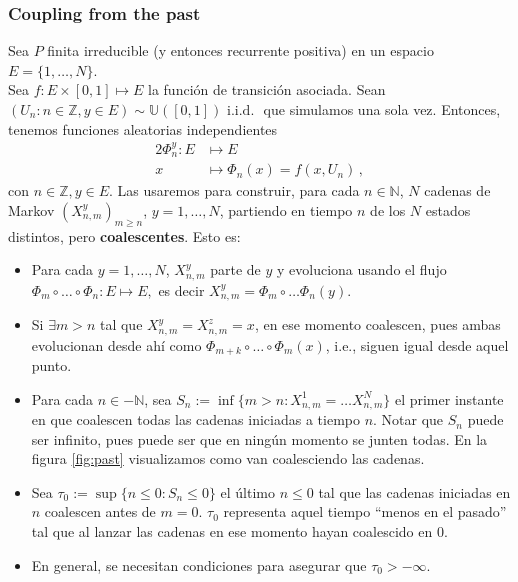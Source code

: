 \documentclass[letterpaper,11pt]{article} %
\theoremstyle{defbreak}
\theoremstyle{propbreak}
\theoremstyle{remark}
\theoremstyle{break}
\def\N{\mathbb{N}}
\def\unif{\mathbb{U}([0,1])}
\def\iid{\mbox{ i.i.d. }}
\begin{document}
\subsubsection{Coupling from the past}
Sea $P$ finita irreducible (y entonces recurrente positiva) en un espacio $E=\{1,\dots,N\}$. \\ Sea $f:E\times[0,1]\mapsto E$ la función de transición asociada. Sean $(U_n:n\in\mathbb{Z},y\in E)\sim\unif\iid$ que simulamos una sola vez.
Entonces, tenemos funciones aleatorias independientes
\begin{alignat*}{2}
\Phi_n^y:E & \longmapsto E \\
x & \longmapsto \Phi_n(x) = f(x,U_n)\, ,
\end{alignat*}
con $n\in\mathbb{Z}, y\in E$. Las usaremos para construir, para cada $n\in\N$, $N$ cadenas de Markov $(X_{n,m}^y)_{m\geq n}$, $y=1,\dots,N$, partiendo en tiempo $n$ de los $N$ estados distintos, pero \textbf{coalescentes}. Esto es:
\begin{itemize}
    \item Para cada $y=1,\dots,N$, $X^y_{n,m}$ parte de $y$ y evoluciona usando el flujo $\Phi_m\circ\dots\circ\Phi_n:E\longmapsto E,$ es decir $X^y_{n,m}=\Phi_m\circ\dots\Phi_n(y)$.
    \item Si $\exists m>n$ tal que $X^y_{n,m}=X^z_{n,m}=x$, en ese momento coalescen, pues ambas evolucionan desde ahí como $\Phi_{m+k}\circ\dots\circ\Phi_m(x)$, i.e., siguen igual desde aquel punto.
    \item Para cada $n\in-\N$, sea $S_n:=\inf\{m>n:X^1_{n,m}=\dots X^N_{n,m}\}$ el primer instante en que coalescen todas las cadenas iniciadas a tiempo $n$. Notar que $S_n$ puede ser infinito, pues puede ser que en ningún momento se junten todas. En la figura \ref{fig:past} visualizamos como van coalesciendo las cadenas.
    \item Sea $\tau_0:=\sup\{n\leq 0:S_n\leq 0\}$ el último $n\leq 0$ tal que las cadenas iniciadas en $n$ coalescen antes de $m=0$. $\tau_0$ representa aquel tiempo ``menos en el pasado'' tal que al lanzar las cadenas en ese momento hayan coalescido en $0$.
    \item En general, se necesitan condiciones para asegurar que $\tau_0>-\infty$.  %
\end{itemize}
\end{document}
